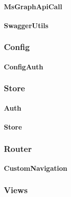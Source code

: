 \paragraph{MsGraphApiCall}\label{par:ms-graph-api-call}
\paragraph{SwaggerUtils}\label{par:swagger-utils}


\subsubsection{Config}\label{subsubsec:config}
\paragraph{ConfigAuth}\label{par:config-auth}

\subsubsection{Store}\label{subsubsec:store}
\paragraph{Auth}\label{par:auth-store}
\paragraph{Store}\label{par:store}

\subsubsection{Router}\label{subsubsec:router}
\paragraph{CustomNavigation}\label{par:custom-navigation}


\subsubsection{Views}\label{subsubsec:views}

